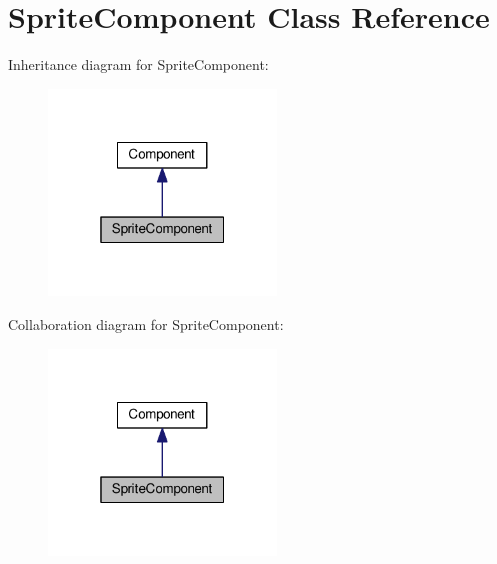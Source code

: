 \hypertarget{classSpriteComponent}{\section{Sprite\-Component Class Reference}
\label{classSpriteComponent}
}


Inheritance diagram for Sprite\-Component\-:
\nopagebreak
\begin{figure}[H]
\begin{center}
\leavevmode
\includegraphics[width=172pt]{classSpriteComponent__inherit__graph}
\end{center}
\end{figure}


Collaboration diagram for Sprite\-Component\-:
\nopagebreak
\begin{figure}[H]
\begin{center}
\leavevmode
\includegraphics[width=172pt]{classSpriteComponent__coll__graph}
\end{center}
\end{figure}
